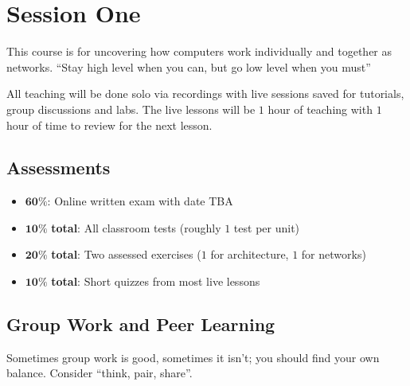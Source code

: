 \section{Session One}\label{sec:session_one}

This course is for uncovering how computers work individually and together as networks.
``Stay high level when you can, but go low level when you must''

All teaching will be done solo via recordings with live sessions saved for tutorials, group discussions and labs.
The live lessons will be \(1\) hour of teaching with \(1\) hour of time to review for the next lesson.

\subsection{Assessments}\label{sub:assessments}

\begin{itemize}
	\item \(\mathbf{60\%}\): Online written exam with date TBA
	\item \(\mathbf{10\%}\) \textbf{total}: All classroom tests (roughly \(1\) test per unit)
	\item \(\mathbf{20\%}\) \textbf{total}: Two assessed exercises (\(1\) for architecture, \(1\) for networks)
	\item \(\mathbf{10\%}\) \textbf{total}: Short quizzes from most live lessons
\end{itemize}

\subsection{Group Work and Peer Learning}\label{sub:group_work_and_peer_learning}

Sometimes group work is good, sometimes it isn't; you should find your own balance.
Consider ``think, pair, share''.
